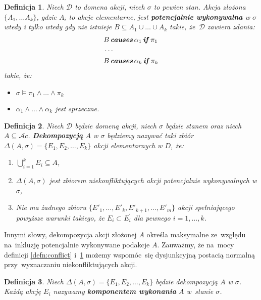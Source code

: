 \documentclass[11pt,a4paper]{article}
\newtheorem{defn}{Definicja}
\DeclareMathOperator{\Causes}{\textbf{\textit{causes}}}
\DeclareMathOperator{\If}{\textbf{\textit{if}}}
\begin{document}
\begin{defn}
    \label{defn:potentially-executable}
    Niech $\mathcal{D}$ to domena akcji, niech $\sigma$ to pewien stan. Akcja złożona $\{ A_1, \dots A_k \}$, gdzie $A_i$ to akcje elementarne, jest \textbf{potencjalnie wykonywalna} w $\sigma$ wtedy i tylko wtedy gdy nie istnieje $B \subseteq A_1 \cup \dots \cup A_k$ takie, że~$\mathcal{D}$ zawiera zdania:
    \begin{align*}
        & B \Causes \alpha_1 \If \pi_1 \\
        & \cdots \\
        & B \Causes \alpha_k \If \pi_k
    \end{align*}
    takie, że:
    \begin{itemize}
        \item $\sigma \models \pi_1 \land \dots \land \pi_k$
        \item $\alpha_1 \land \dots \land \alpha_k$ jest sprzeczne.
    \end{itemize}
\end{defn}

\begin{defn}
    Niech $\mathcal{D}$ będzie domeną akcji, niech $\sigma$ będzie stanem oraz niech $A \subseteq \mathcal{A}c$.
    \textbf{Dekompozycją} $A$ w $\sigma$ będziemy nazywać taki zbiór $\Delta(A, \sigma) = \{ E_1, E_2, \dots, E_k \}$ akcji elementarnych w $D$, że:
    \begin{enumerate}
        \item $\bigcup_{i = 1}^{k} E_i \subseteq A$,
        \item $\Delta(A, \sigma)$ jest zbiorem niekonfliktujących akcji potencjalnie wykonywalnych w  $\sigma$,
        \item Nie ma żadnego zbioru $\{ E'_1, \dots, E'_k, E'_{k+1}, \dots, E'_m \}$ akcji spełniającego powyższe warunki takiego, że $E_i \subset E_i^\prime$ dla pewnego $i = 1, \dots, k$.
    \end{enumerate}
\end{defn}

Innymi słowy, dekompozycja akcji złożonej $A$ określa maksymalne ze~względu na~inkluzję potencjalnie wykonywane podakcje $A$.
Zauważmy, że na~mocy definicji \ref{defn:conflict} i~\ref{defn:potentially-executable} możemy wspomóc~się dysjunkcyjną postacią normalną przy~wyznaczaniu niekonfliktujących akcji.
    
\begin{defn}
    Niech $\Delta(A, \sigma) = \{ E_1, E_2, \dots, E_k \}$ będzie dekompozycją $A$ w $\sigma$. Każdą akcję $E_i$ nazywamy \textbf{komponentem wykonania} $A$ w~stanie $\sigma$.
\end{defn}
    
\end{document}

